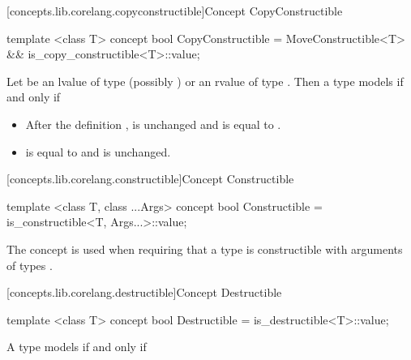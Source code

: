 \begin{addedblock}
[concepts.lib.corelang.copyconstructible]{Concept CopyConstructible}

%
\begin{itemdecl}
template <class T>
concept bool CopyConstructible =
  MoveConstructible<T> && is_copy_constructible<T>::value;
\end{itemdecl}

\begin{itemdescr}
\pnum
Let  be an lvalue of type (possibly )  or an rvalue
of type . Then a type  models  if
and only if

\begin{itemize}
\item After the definition ,  is unchanged and is equal
to .
\item {} is equal to  and  is unchanged.
\end{itemize}
\end{itemdescr}

[concepts.lib.corelang.constructible]{Concept Constructible}

%
\begin{itemdecl}
template <class T, class ...Args>
concept bool Constructible =
  is_constructible<T, Args...>::value;
\end{itemdecl}

\begin{itemdescr}
\pnum
The  concept is used when requiring that a type  is
constructible with arguments of types .
\end{itemdescr}

[concepts.lib.corelang.destructible]{Concept Destructible}

%
\begin{itemdecl}
template <class T>
concept bool Destructible =
  is_destructible<T>::value;
\end{itemdecl}

\begin{itemdescr}
\pnum
A type  models  if and only if


\end{itemdescr}
\end{addedblock}
